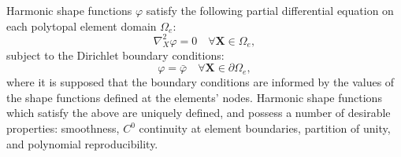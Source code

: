 
Harmonic shape functions $\varphi$ satisfy the following partial differential equation on each polytopal element domain $\Omega_e$:
\begin{equation}
	\nabla^2_X \varphi = 0 \quad \forall \mathbf{X} \in \Omega_e,
\end{equation}
subject to the Dirichlet boundary conditions:
\begin{equation}
	\varphi = \bar{\varphi} \quad \forall \mathbf{X} \in \partial \Omega_e,
\end{equation}
where it is supposed that the boundary conditions are informed by the values of the shape functions defined at the elements' nodes. Harmonic shape functions which satisfy the above are uniquely defined, and possess a number of desirable properties: smoothness, $C^0$ continuity at element boundaries, partition of unity, and polynomial reproducibility.

